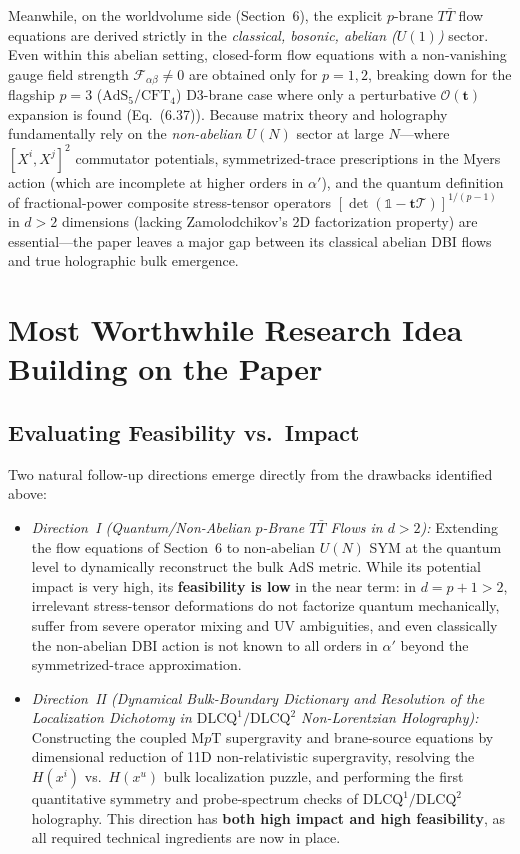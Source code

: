 \documentclass[11pt,a4paper]{article}
\newcommand{\lambdap}{\boldsymbol{t}}
\begin{document}
\begin{enumerate}[label=(\alph*),leftmargin=1.8em]
    Meanwhile, on the worldvolume side (Section~6), the explicit $p$-brane $T\bar{T}$ flow equations are derived strictly in the \emph{classical, bosonic, abelian ($U(1)$)} sector. Even within this abelian setting, closed-form flow equations with a non-vanishing gauge field strength $\mathcal{F}_{\alpha\beta} \neq 0$ are obtained only for $p=1,2$, breaking down for the flagship $p=3$ ($\text{AdS}_5/\text{CFT}_4$) D3-brane case where only a perturbative $\mathcal{O}(\lambdap)$ expansion is found (Eq.~(6.37)). Because matrix theory and holography fundamentally rely on the \emph{non-abelian $U(N)$} sector at large $N$---where $[X^i,X^j]^2$ commutator potentials, symmetrized-trace prescriptions in the Myers action (which are incomplete at higher orders in $\alpha'$), and the quantum definition of fractional-power composite stress-tensor operators $[\det(\mathbb{1}-\lambdap\mathcal{T})]^{1/(p-1)}$ in $d > 2$ dimensions (lacking Zamolodchikov's 2D factorization property) are essential---the paper leaves a major gap between its classical abelian DBI flows and true holographic bulk emergence.
\end{enumerate}

\section{Most Worthwhile Research Idea Building on the Paper}

\subsection*{Evaluating Feasibility vs.\ Impact}
Two natural follow-up directions emerge directly from the drawbacks identified above:
\begin{itemize}[leftmargin=1.8em]
    \item \emph{Direction~I (Quantum/Non-Abelian $p$-Brane $T\bar{T}$ Flows in $d > 2$):} Extending the flow equations of Section~6 to non-abelian $U(N)$ SYM at the quantum level to dynamically reconstruct the bulk AdS metric. While its potential impact is very high, its \textbf{feasibility is low} in the near term: in $d = p+1 > 2$, irrelevant stress-tensor deformations do not factorize quantum mechanically, suffer from severe operator mixing and UV ambiguities, and even classically the non-abelian DBI action is not known to all orders in $\alpha'$ beyond the symmetrized-trace approximation.
    \item \emph{Direction~II (Dynamical Bulk-Boundary Dictionary and Resolution of the Localization Dichotomy in $\text{DLCQ}^1/\text{DLCQ}^2$ Non-Lorentzian Holography):} Constructing the coupled M$p$T supergravity and brane-source equations by dimensional reduction of 11D non-relativistic supergravity, resolving the $H(x^i)$ vs.\ $H(x^u)$ bulk localization puzzle, and performing the first quantitative symmetry and probe-spectrum checks of $\text{DLCQ}^1/\text{DLCQ}^2$ holography. This direction has \textbf{both high impact and high feasibility}, as all required technical ingredients are now in place.
\end{itemize}
\end{document}
